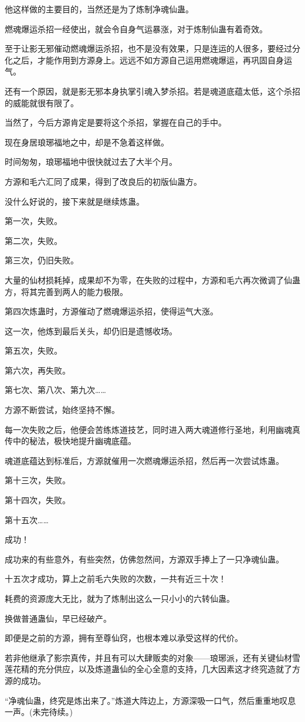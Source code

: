 \begin{this_body}
他这样做的主要目的，当然还是为了炼制净魂仙蛊。

燃魂爆运杀招一经使出，就会令自身气运暴涨，对于炼制仙蛊有着奇效。

至于让影无邪催动燃魂爆运杀招，也不是没有效果，只是连运的人很多，要经过分化之后，才能作用到方源身上。远远不如方源自己运用燃魂爆运，再巩固自身运气。

还有一个原因，就是影无邪本身执掌引魂入梦杀招。若是魂道底蕴太低，这个杀招的威能就很有限了。

当然了，今后方源肯定是要将这个杀招，掌握在自己的手中。

现在身居琅琊福地之中，却是不急着这样做。

时间匆匆，琅琊福地中很快就过去了大半个月。

方源和毛六汇同了成果，得到了改良后的初版仙蛊方。

没什么好说的，接下来就是继续炼蛊。

第一次，失败。

第二次，失败。

第三次，仍旧失败。

大量的仙材损耗掉，成果却不为零，在失败的过程中，方源和毛六再次微调了仙蛊方，将其完善到两人的能力极限。

第四次炼蛊时，方源催动了燃魂爆运杀招，使得运气大涨。

这一次，他炼到最后关头，却仍旧是遗憾收场。

第五次，失败。

第六次，再失败。

第七次、第八次、第九次……

方源不断尝试，始终坚持不懈。

每一次失败之后，他便会苦练炼道技艺，同时进入两大魂道修行圣地，利用幽魂真传中的秘法，极快地提升幽魂底蕴。

魂道底蕴达到标准后，方源就催用一次燃魂爆运杀招，然后再一次尝试炼蛊。

第十三次，失败。

第十四次，失败。

第十五次……

成功！

成功来的有些意外，有些突然，仿佛忽然间，方源双手捧上了一只净魂仙蛊。

十五次才成功，算上之前毛六失败的次数，一共有近三十次！

耗费的资源庞大无比，就为了炼制出这么一只小小的六转仙蛊。

换做普通蛊仙，早已经破产。

即便是之前的方源，拥有至尊仙窍，也根本难以承受这样的代价。

若非他继承了影宗真传，并且有可以大肆贩卖的对象——琅琊派，还有关键仙材雪莲花精的充分供应，以及炼道蛊仙的全心全意的支持，几大因素这才终究造就了方源的成功。

“净魂仙蛊，终究是炼出来了。”炼道大阵边上，方源深吸一口气，然后重重地叹息一声。(未完待续。)

\end{this_body}

